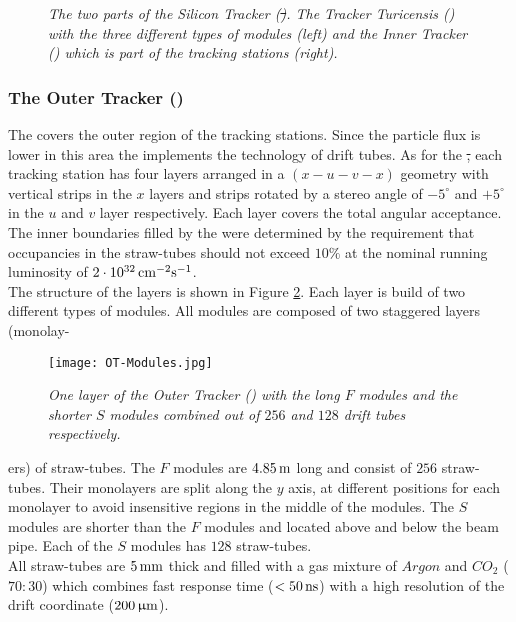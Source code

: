 \begin{figure}[ht]
  \begin{center}
  \vspace*{-0.cm}
  \vspace*{-1.0cm}
  \end{center}
  \caption{\textit{The two parts of the Silicon Tracker (\st). The Tracker Turicensis (\ttracker) with the three different types of modules (left) and the Inner Tracker (\intr) which is part of the tracking stations (right).}\cite{it}}
  \label{fig:st}
\end{figure}



\subsubsection{The Outer Tracker (\ot)}
The \ot \cite{ot} covers the outer region of the tracking stations. Since the particle flux is lower in this area the \ot implements the technology of drift tubes.
As for the \st, each \ot tracking station has four layers arranged in a $(x-u-v-x)$ geometry with vertical strips in the $x$ layers and strips rotated by a stereo angle of $-5^{\circ}$ and $+5^{\circ}$ in the $u$ and $v$ layer respectively. Each layer covers the total \lhcb angular acceptance. The inner boundaries filled by the \intr were determined by the requirement that occupancies in the straw-tubes should not exceed $10\%$ at the nominal running luminosity of $2\cdot 10^{32} \rm \,cm^{-2}s^{-1}$.\\
The structure of the \ot layers is shown in Figure \ref{fig:ot}. Each layer is  build of two different types of modules. All modules are composed of two staggered layers (monolay-
\begin{figure}[ht]
  \begin{center}
  	\vspace*{-0.5cm}
    \texttt{[image: OT-Modules.jpg]}
  \vspace*{-0.5cm}
  \end{center}
  \caption{\textit{One layer of the Outer Tracker (\ot) with the long $F$ modules and the shorter $S$ modules combined out of $256$ and $128$ drift tubes respectively.}\cite{ot}}
  \label{fig:ot}
\end{figure}
ers) of straw-tubes.
The $F$ modules are $4.85\rm \,m$ long and consist of $256$ straw-tubes. Their monolayers are split along the $y$ axis, at different positions for each monolayer to avoid insensitive regions in the middle of the modules.
The $S$ modules are shorter than the $F$ modules and located above and below the beam pipe. Each of the $S$ modules has $128$ straw-tubes.\\
All straw-tubes are $5 \rm \,mm$ thick and filled with a gas mixture of $Argon$ and $CO_2$ ($70:30$) which combines fast response time ($<50 {\rm \,ns}$) with a high resolution of the drift coordinate ($200\,\upmu\rm m$).\\


